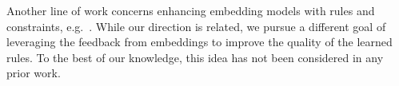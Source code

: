 Another line of work concerns enhancing embedding models with 
rules and constraints, 
e.g.~\cite{DBLP:conf/emnlp/GuoWWWG16,DBLP:journals/corr/abs-1711-11231,DBLP:conf/sigir/RastogiPD17,Wang2015KnowledgeBC}. While our direction is related, we pursue a different goal of 
leveraging
the feedback from embeddings to improve the quality of the learned rules. 
To the best of our knowledge, this idea has not been considered 
in any prior work.


